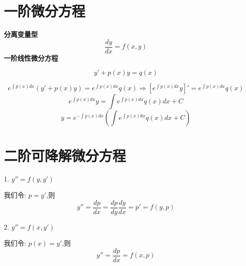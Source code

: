 \section{一阶微分方程}
\textbf{分离变量型} \label{def: 分离变量型一阶微分方程}
$$\frac{dy}{dx}=f(x,y)$$
\textbf{一阶线性微分方程} \label{def: 一阶线性微分方程公式}
\begin{definition}
	$$y'+p(x)y=q(x)$$
\end{definition}
\begin{theorem}[一阶线性微分方程解]
	$$e^{\int p(x)dx}(y'+p(x)y)=e^{\int p(x)dx}q(x)\Rightarrow \left[e^{\int p(x)dx}y \right]'=e^{\int p(x)dx}q(x) $$
	$$e^{\int p(x)dx}y=\int e^{\int p(x)dx}q(x)dx+C$$
	$$y=e^{-\int p(x)dx}(\int e^{\int p(x)dx}q(x)dx+C)$$
\end{theorem}

\section{二阶可降解微分方程}
\begin{definition}

	1. $y''=f(y,y')$

	我们令:  $p=y'$,则 $$y''=\frac{dp}{dx}=\frac{dp}{dy}\frac{dy}{dx}=p'=f(y,p)$$

	2. $y''=f(x,y')$

	我们令:  $p(x)=y'$,则
	$$y''=\frac{dp}{dx}=f(x,p)$$
\end{definition}

